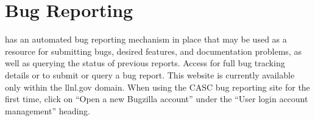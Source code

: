 \section{Bug Reporting}

\hypre{} has an automated bug reporting mechanism in place that may be used 
as a resource for submitting bugs, desired features, and documentation
problems, as well as querying the status of previous reports.  Access
for full bug tracking details or to submit or query a bug report.
This website is currently available only within the llnl.gov domain.
When using the CASC bug reporting site for the first time, click on
``Open a new Bugzilla account'' under the ``User login account
management'' heading.

